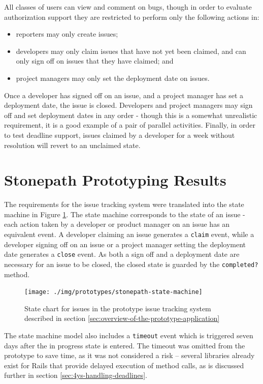 \documentclass[document.tex]{subfiles}
\begin{document}
All classes of users can view and comment on bugs, though in order to evaluate authorization support they are restricted to perform only the following actions in:
\begin{itemize}
\item reporters may only create issues;
\item developers may only claim issues that have not yet been claimed, and can only sign off on issues that they have claimed; and
\item project managers may only set the deployment date on issues.
\end{itemize}

Once a developer has signed off on an issue, and a project manager has set a deployment date, the issue is closed. Developers and project managers may sign off and set deployment dates in any order - though this is a somewhat unrealistic requirement, it is a good example of a pair of parallel activities. Finally, in order to test deadline support, issues claimed by a developer for a week without resolution will revert to an unclaimed state.


\section {Stonepath Prototyping Results}
\label {sec:stonepath-prototyping-results}

The requirements for the issue tracking system were translated into the state machine in Figure \ref{fig:stonepath-prototype-state-machine}. The state machine corresponds to the state of an issue - each action taken by a developer or product manager on an issue has an equivalent event. A developer claiming an issue generates a \verb!claim! event, while a developer signing off on an issue or a project manager setting the deployment date generates a \verb!close! event. As both a sign off and a deployment date are necessary for an issue to be closed, the closed state is guarded by the \verb!completed?! method.

\begin{figure}[!ht]
\centering \texttt{[image: ./img/prototypes/stonepath-state-machine]}
\caption{State chart for issues in the prototype issue tracking system described in section \ref{sec:overview-of-the-prototype-application}}
\label{fig:stonepath-prototype-state-machine}
\end{figure}

The state machine model also includes a \verb!timeout! event which is triggered seven days after the in progress state is entered. The timeout was omitted from the prototype to save time, as it was not considered a risk -- several libraries already exist for Rails that provide delayed execution of method calls, as is discussed further in section \ref{sec:4ys-handling-deadlines}.
\end{document}
